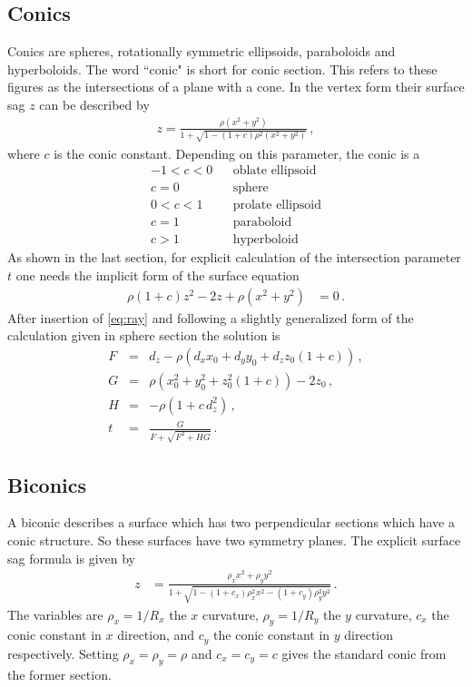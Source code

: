 \documentclass[12pt,a4paper,twoside,openright,BCOR10mm,headsepline,titlepage,abstracton,chapterprefix,final]{scrreprt}
\begin{document}
\subsection{Conics}
Conics are spheres, rotationally symmetric ellipsoids, paraboloids and hyperboloids.
The word ``conic" is short for conic section. This refers to these figures as the
intersections of a plane with a cone.
In the vertex form their surface sag $z$ can be described by
\begin{eqnarray}
 z =  \frac
 { \rho ( x^2 + y^2 ) }
 { 1 + \sqrt{1 - (1+c) \rho^2  (x^2 + y^2)} }\,,
\end{eqnarray}
where $c$ is the conic constant. Depending on this parameter, the conic is a
\begin{eqnarray*}
-1 < c < 0 && \textrm{oblate ellipsoid} \\
     c = 0 && \textrm{sphere} \\
 0 < c < 1 && \textrm{prolate ellipsoid} \\
     c = 1 && \textrm{paraboloid} \\
     c > 1 && \textrm{hyperboloid}
\end{eqnarray*}
As shown in the last section, for explicit calculation of the intersection parameter $t$ one
needs the implicit form of the surface equation
\begin{align}
 \rho (1 + c) z^2 - 2 z + \rho (x^2 + y^2) &=0\,.
\end{align}
After insertion of \eqref{eq:ray} and following a slightly generalized form of the calculation
given in sphere section the solution is
\begin{subequations}
\label{eq:intersectionconicsection}
\begin{eqnarray}
   F &=& d_z - \rho \left( d_x x_0 + d_y y_0 + d_z z_0 (1+c) \right)\,, \\
   G &=& \rho (x_0^2 + y_0^2 + z_0^2 (1+c)) - 2 z_0\,, \\
   H &=& - \rho ( 1 + c \, d_z^2 )\,, \\
   t &=& \frac{G}{ F + \sqrt{F^2 + H G} }\,.
\end{eqnarray}
\end{subequations}

\subsection{Biconics}
A biconic describes a surface which has two perpendicular sections
which have a conic structure. So these surfaces have two symmetry planes.
The explicit surface sag formula is given by
\begin{align}
 z &= \frac{\rho_x x^2 + \rho_y y^2}{1 + \sqrt{1 - (1+c_x) \rho_x^2 x^2 - (1+c_y) \rho_y^2 y^2}} \label{eq:biconic}\,.
\end{align}
The variables are $\rho_x = 1/R_x$ the $x$ curvature, $\rho_y = 1/R_y$ the $y$ curvature, $c_x$ the conic constant in $x$ direction,
and $c_y$ the conic constant in $y$ direction respectively. Setting $\rho_x = \rho_y = \rho$ and $c_x = c_y = c$ gives
the standard conic from the former section.
\end{document}

